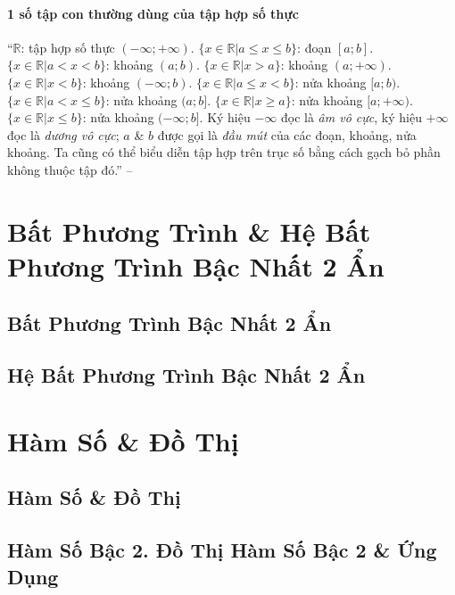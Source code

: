 \documentclass[oneside]{book}
\numberwithin{equation}{section}
\begin{document}
\subsubsection{1 số tập con thường dùng của tập hợp số thực}
``$\mathbb{R}$: tập hợp số thực $(-\infty;+\infty)$. $\{x\in\mathbb{R}|a\le x\le b\}$: đoạn $[a;b]$. $\{x\in\mathbb{R}|a < x < b\}$: khoảng $(a;b)$. $\{x\in\mathbb{R}|x  > a\}$: khoảng $(a;+\infty)$. $\{x\in\mathbb{R}|x < b\}$: khoảng $(-\infty;b)$. $\{x\in\mathbb{R}|a\le x < b\}$: nửa khoảng $[a;b)$. $\{x\in\mathbb{R}|a < x\le b\}$: nửa khoảng $(a;b]$. $\{x\in\mathbb{R}|x\ge a\}$: nửa khoảng $[a;+\infty)$. $\{x\in\mathbb{R}|x\le b\}$: nửa khoảng $(-\infty;b]$. Ký hiệu $-\infty$ đọc là \textit{âm vô cực}, ký hiệu $+\infty$ đọc là \textit{dương vô cực}; $a$ \& $b$ được gọi là \textit{đầu mút} của các đoạn, khoảng, nửa khoảng. Ta cũng có thể biểu diễn tập hợp trên trục số bằng cách gạch bỏ phần không thuộc tập đó.'' -- \cite[p. 17]{SGK_Toan_10_Canh_Dieu_tap_1}


\chapter{Bất Phương Trình \& Hệ Bất Phương Trình Bậc Nhất 2 Ẩn}

\section{Bất Phương Trình Bậc Nhất 2 Ẩn}

\section{Hệ Bất Phương Trình Bậc Nhất 2 Ẩn}


\chapter{Hàm Số \& Đồ Thị}

\section{Hàm Số \& Đồ Thị}

\section{Hàm Số Bậc 2. Đồ Thị Hàm Số Bậc 2 \& Ứng Dụng}
\end{document}
